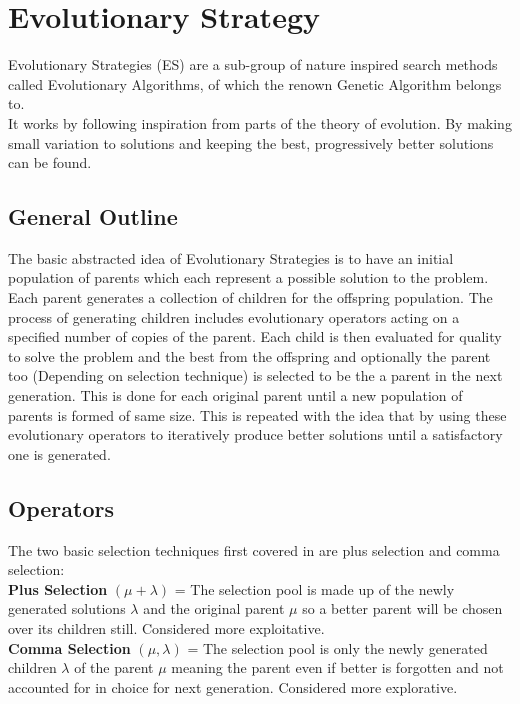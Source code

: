 \documentclass{report}
\begin{document}
\section{Evolutionary Strategy}

Evolutionary Strategies (ES) are a sub-group of nature inspired search methods called Evolutionary Algorithms, of which the renown Genetic Algorithm belongs to.\\
It works by following inspiration from parts of the theory of evolution. By making small variation to solutions and keeping the best, progressively better solutions can
be found.

\subsection{General Outline}

The basic abstracted idea of Evolutionary Strategies is to have an initial population of parents which each represent a possible solution to the problem. Each parent 
generates a collection of children for the offspring population. The process of generating children includes evolutionary operators acting on a specified number of 
copies of the parent. Each child is then evaluated for quality to solve the problem and the best from the offspring and optionally the parent too (Depending on selection technique) is selected to be 
the a parent in the next generation. This is done for each original parent until a new population of parents is formed of same size. This is repeated with the idea 
that by using these evolutionary operators to iteratively produce better solutions until a satisfactory one is generated.

\subsection{Operators}

The two basic selection techniques first covered in \citep{rechenberg1973evolution} are plus selection and comma selection:\\

\textbf{Plus Selection} $(\mu + \lambda)$ = The selection pool is made up of the newly generated solutions $\lambda$ and the original parent $\mu$ so a better parent will be chosen over its children still. Considered more exploitative.\\
\textbf{Comma Selection} $(\mu , \lambda)$ = The selection pool is only the newly generated children  $\lambda$ of the parent $\mu$ meaning the parent even if better is forgotten and not accounted for in choice for next generation. Considered more explorative.
\end{document}

